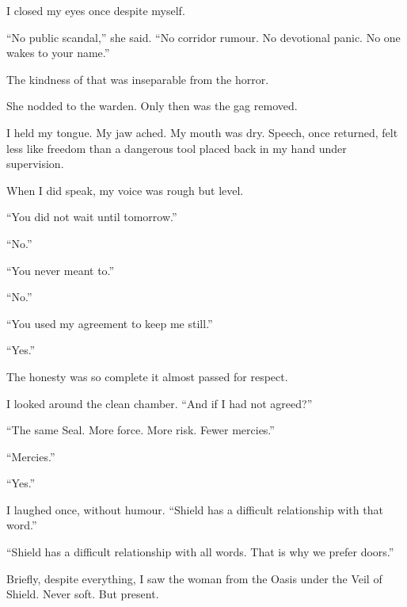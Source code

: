 I closed my eyes once despite myself.\par

``No public scandal,'' she said. ``No corridor rumour. No devotional panic. No one wakes to your name.''\par

The kindness of that was inseparable from the horror.\par

She nodded to the warden. Only then was the gag removed.\par

I held my tongue. My jaw ached. My mouth was dry. Speech, once returned, felt less like freedom than a dangerous tool placed back in my hand under supervision.\par

When I did speak, my voice was rough but level.\par

``You did not wait until tomorrow.''\par

``No.''\par

``You never meant to.''\par

``No.''\par

``You used my agreement to keep me still.''\par

``Yes.''\par

The honesty was so complete it almost passed for respect.\par

I looked around the clean chamber. ``And if I had not agreed?''\par

``The same Seal. More force. More risk. Fewer mercies.''\par

``Mercies.''\par

``Yes.''\par

I laughed once, without humour. ``Shield has a difficult relationship with that word.''\par

``Shield has a difficult relationship with all words. That is why we prefer doors.''\par

Briefly, despite everything, I saw the woman from the Oasis under the Veil of Shield. Never soft. But present.\par

